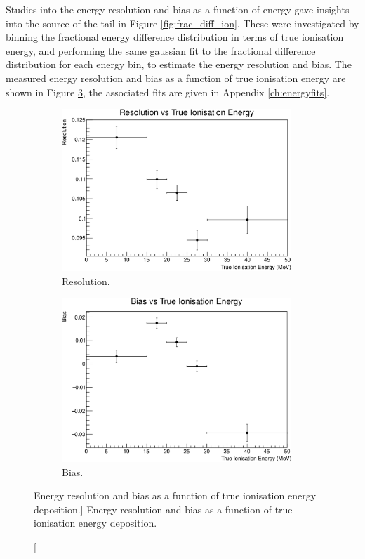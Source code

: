 Studies into the energy resolution and bias as a function of energy gave
insights into the source of the tail in Figure \ref{fig:frac_diff_ion}. These
were investigated by binning the fractional energy difference distribution in
terms of true ionisation energy, and performing the same gaussian fit to the
fractional difference distribution for each energy bin, to estimate the energy
resolution and bias. The measured energy resolution and bias as a function of 
true ionisation energy are shown in Figure \ref{fig:res_and_bias_ion}, the 
associated fits are given in Appendix \ref{ch:energyfits}.
\begin{figure}
	\centering
	\begin{subfigure}[b]{\textwidth}
		\centering
		\includegraphics[width=0.95\textwidth]{figures/res_v_energy_ion.pdf}
		\caption {Resolution.}
		\label{fig:res_ion}
	\end{subfigure}
	\begin{subfigure}[b]{\textwidth}
		\centering
		\vspace{5mm}
		\includegraphics[width=0.95\textwidth]{figures/bias_v_energy_ion.pdf}
		\caption {Bias.}
		\label{fig:bias_ion}
	\end{subfigure}
	\caption
	[Energy resolution and bias as a function of true ionisation energy deposition.]
	{Energy resolution and bias as a function of true ionisation energy deposition.}
	\label{fig:res_and_bias_ion}
\end{figure}

